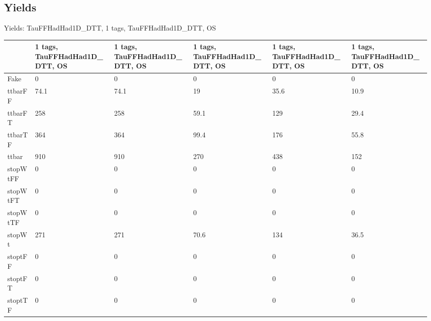 
\subsection{Yields}

\begin{frame}{Yields: TauFFHadHad1D\_DTT, 1 tags, TauFFHadHad1D\_DTT, OS}
\begin{center}
  \begin{tabular}{l| >{\centering\let\newline\\\arraybackslash\hspace{0pt}}m{1.4cm}| >{\centering\let\newline\\\arraybackslash\hspace{0pt}}m{1.4cm}| >{\centering\let\newline\\\arraybackslash\hspace{0pt}}m{1.4cm}| >{\centering\let\newline\\\arraybackslash\hspace{0pt}}m{1.4cm}| >{\centering\let\newline\\\arraybackslash\hspace{0pt}}m{1.4cm}}
    & 1 tags, TauFFHadHad1D\_DTT, OS & 1 tags, TauFFHadHad1D\_DTT, OS & 1 tags, TauFFHadHad1D\_DTT, OS & 1 tags, TauFFHadHad1D\_DTT, OS & 1 tags, TauFFHadHad1D\_DTT, OS \\
 \hline \hline
    Fake& 0 & 0 & 0 & 0 & 0 \\
 \hline
    ttbarFF& 74.1 & 74.1 & 19 & 35.6 & 10.9 \\
 \hline
    ttbarFT& 258 & 258 & 59.1 & 129 & 29.4 \\
 \hline
    ttbarTF& 364 & 364 & 99.4 & 176 & 55.8 \\
 \hline
    ttbar& 910 & 910 & 270 & 438 & 152 \\
 \hline
    stopWtFF& 0 & 0 & 0 & 0 & 0 \\
 \hline
    stopWtFT& 0 & 0 & 0 & 0 & 0 \\
 \hline
    stopWtTF& 0 & 0 & 0 & 0 & 0 \\
 \hline
    stopWt& 271 & 271 & 70.6 & 134 & 36.5 \\
 \hline
    stoptFF& 0 & 0 & 0 & 0 & 0 \\
 \hline
    stoptFT& 0 & 0 & 0 & 0 & 0 \\
 \hline
    stoptTF& 0 & 0 & 0 & 0 & 0 \\

\end{tabular}
\end{center}
\end{frame}
